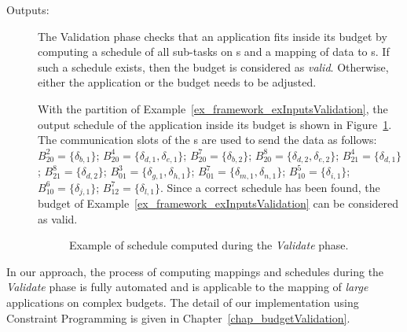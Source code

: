 \documentclass[main.tex]{subfiles}
\begin{document}
\begin{description}
    \item[Outputs: ]
        The Validation phase checks that an application fits inside its budget
        by computing a schedule of all sub-tasks on \PN{}s and a mapping of
        data to \PC{}s. If such a schedule exists, then the budget is
        considered as \emph{valid}. Otherwise, either the application or the
        budget needs to be adjusted.   
        \begin{example}
            With the partition of
            Example~\ref{ex_framework_exInputsValidation}, the output schedule
            of the application inside its budget is shown in
            Figure~\ref{fig_framework_exOutputValidation}. The communication
            slots of the \PC{}s are used to send the data as follows:
            $B_{20}^2 = \{ \delta_{b,1} \}$;
            $B_{20}^4 = \{ \delta_{d,1}, \delta_{e,1} \}$;
            $B_{20}^7 = \{ \delta_{b,2} \}$;
            $B_{20}^8 = \{ \delta_{d,2}, \delta_{e,2} \}$;
            $B_{21}^4 = \{ \delta_{d,1} \}$;
            $B_{21}^8 = \{ \delta_{d,2} \}$;
            $B_{01}^3 = \{ \delta_{g,1} , \delta_{h,1}\}$;
            $B_{01}^7 = \{ \delta_{m,1} , \delta_{n,1}\}$;
            $B_{10}^5 = \{ \delta_{i,1} \}$;
            $B_{10}^6 = \{ \delta_{j,1} \}$;
            $B_{12}^7 = \{ \delta_{l,1} \}$.
            Since a correct schedule has been found, the budget of
            Example~\ref{ex_framework_exInputsValidation} can be considered as
            valid.
            \begin{figure}
                \centering
                \scalebox{0.8}{}
                \caption{Example of schedule computed during the \emph{Validate} phase.}
                \label{fig_framework_exOutputValidation}
            \end{figure}
        \end{example}
\end{description}

In our approach, the process of computing mappings and schedules during the
\emph{Validate} phase is fully automated and is applicable to the mapping of
\emph{large} applications on complex budgets. The detail of our implementation
using Constraint Programming is given in Chapter~\ref{chap_budgetValidation}.
\end{document}
